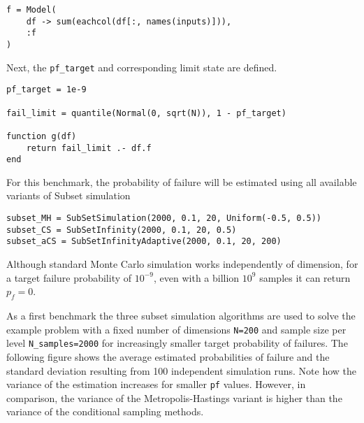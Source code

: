 \begin{verbatim}
f = Model(
    df -> sum(eachcol(df[:, names(inputs)])),
    :f
)
\end{verbatim}



Next, the \texttt{pf\_target} and corresponding limit state are defined.




\begin{verbatim}
pf_target = 1e-9

fail_limit = quantile(Normal(0, sqrt(N)), 1 - pf_target)

function g(df)
    return fail_limit .- df.f
end
\end{verbatim}



For this benchmark, the probability of failure will be estimated using all available variants of Subset simulation




\begin{verbatim}
subset_MH = SubSetSimulation(2000, 0.1, 20, Uniform(-0.5, 0.5))
subset_CS = SubSetInfinity(2000, 0.1, 20, 0.5)
subset_aCS = SubSetInfinityAdaptive(2000, 0.1, 20, 200)
\end{verbatim}



\begin{tcolorbox}[toptitle=-1mm,bottomtitle=1mm,colback=admonition-note!50!white,colframe=admonition-note,title=\textbf{Monte Carlo simulation}]
Although standard Monte Carlo simulation works independently of dimension, for a target failure probability of \(10^{-9}\), even with a billion \(10^9\) samples it can return \(p_f=0\).

\end{tcolorbox}


As a first benchmark the three subset simulation algorithms are used to solve the example problem with a fixed number of dimensions \texttt{N=200} and sample size per level \texttt{N\_samples=2000} for increasingly smaller target probability of failures. The following figure shows the average estimated probabilities of failure and the standard deviation resulting from 100 independent simulation runs. Note how the variance of the estimation increases for smaller \texttt{pf} values. However, in comparison, the variance of the Metropolis-Hastings variant is higher than the variance of the conditional sampling methods.



